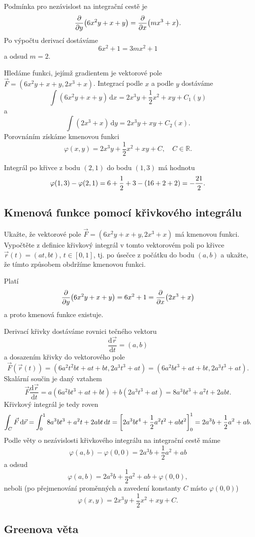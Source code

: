 Podmínka pro nezávislost na integrační cestě je $$\pdv{y}\qty(6x^2y+x+y)=\pdv{x}\qty(mx^3+x).$$
Po výpočtu derivací dostáváme
$$6x^2+1=3mx^2+1$$
a odsud $m=2$.

Hledáme funkci, jejímž gradientem je vektorové pole $\vec F=(6x^2y+x+y,2x^3+x)$. 
Integrací podle $x$ a podle $y$ dostáváme
$$\int (6x^2y+x+y)\,\mathrm dx= 2x^3y+\frac 12 x^2+xy+C_1(y) $$
a
$$\int (2x^3+x)\,\mathrm dy=2x^3y+xy+C_2(x).$$
Porovnáním získáme kmenovou funkci
$$\varphi(x,y)=2x^3y+\frac 12 x^2+xy+C,
\quad C
\in
\mathbb R.$$

Integrál po křivce  z bodu $(2,1)$ do bodu $(1,3)$
má hodnotu
$$\varphi(1,3)-\varphi(2,1)=6+\frac 12 +3-\qty(16+2+2)=-\frac{21}2.$$

\konec


\subsection{Kmenová funkce pomocí křivkového integrálu}

Ukažte, že vektorové pole
$\vec F=(6x^2y+x+y,2x^3+x)$ má kmenovou funkci. Vypočtěte z definice křivkový integrál v tomto vektorovém poli po křivce $\vec r(t)=(at,bt)$, $t\in[0,1]$, tj. po úsečce z počátku do bodu $(a,b)$ a ukažte, že tímto způsobem obdržíme kmenovou funkci.  

\reseni
Platí $$\pdv{y}\qty(6x^2y+x+y)=6x^2+1=\pdv{x}\qty(2x^3+x)$$
a proto kmenová funkce existuje.

Derivací křivky dostáváme rovnici tečného vektoru
$$\frac{\mathrm d\vec r}{\mathrm dt}=(a,b)$$
a dosazením křivky do vektorového pole
$$\vec F(\vec r(t))=(6a^2t^2bt+at+bt,2a^3t^3+at)=(6a^2bt^3+at+bt,2a^3t^3+at).$$
Skalární součin je daný vztahem
$$\vec F\frac{\mathrm d\vec r}{\mathrm dt}=a(6a^2bt^3+at+bt)+b(2a^3t^3+at)
=8a^3b t^3+a^2t+2abt.
$$
Křivkový integrál je tedy roven
$$\int_C \vec F\,\mathrm d\vec r=
\int_0^1 8a^3b t^3+a^2t+2abt\,\mathrm dt=
\qty[2a^3bt^4+\frac 12 a^2 t^2+abt^2]_0^1=2a^3b+\frac 12 a^2+ab.
$$
Podle věty o nezávislosti křivkového integrálu na integrační cestě máme
$$\varphi(a,b)-\varphi(0,0)=2a^3b+\frac 12 a^2+ab$$
a odsud
$$\varphi(a,b)=2a^3b+\frac 12 a^2+ab+\varphi(0,0),$$
neboli (po přejmenování proměnných a zavedení konstanty $C$ místo $\varphi(0,0)$)
$$\varphi(x,y)=2x^3y+\frac 12 x^2+xy+C.$$

\konec

\subsection{Greenova věta}

